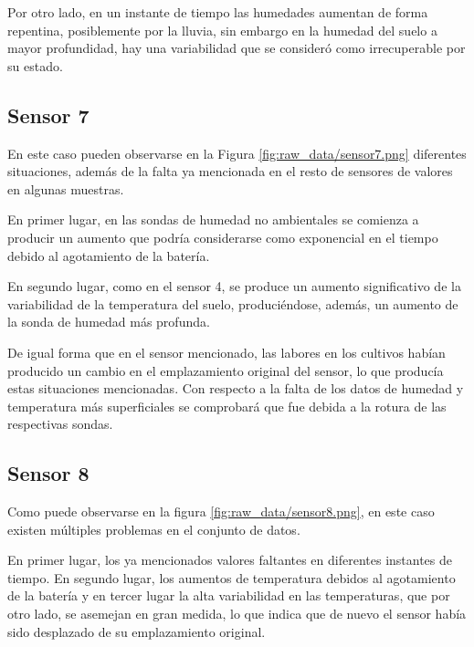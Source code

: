 Por otro lado, en un instante de tiempo las humedades aumentan de forma repentina, posiblemente
por la lluvia, sin embargo en la humedad del suelo a mayor profundidad, hay una variabilidad
que se consideró como irrecuperable por su estado.

\newpage
\subsection{Sensor 7}


En este caso pueden observarse en la Figura \ref{fig:raw_data/sensor7.png} diferentes
situaciones, además de la falta ya mencionada en el resto de sensores de valores
en algunas muestras.

En primer lugar, en las sondas de humedad no ambientales se comienza a producir un aumento
que podría considerarse como exponencial en el tiempo debido al agotamiento de la batería.

En segundo lugar, como en el sensor 4, se produce un aumento significativo de la variabilidad
de la temperatura del suelo, produciéndose, además, un aumento de la sonda de
humedad más profunda.

De igual forma que en el sensor mencionado, las labores en los cultivos habían producido un
cambio en el emplazamiento original del sensor, lo que producía estas situaciones mencionadas.
Con respecto a la falta de los datos de humedad y temperatura más superficiales se 
comprobará que fue debida a la rotura de las respectivas sondas.

\newpage
\subsection{Sensor 8}


Como puede observarse en la figura \ref{fig:raw_data/sensor8.png}, en este caso existen 
múltiples problemas en el conjunto de datos.

En primer lugar, los ya mencionados valores faltantes en diferentes instantes de tiempo.
En segundo lugar, los aumentos de temperatura debidos al agotamiento de la batería y en tercer
lugar la alta variabilidad en las temperaturas, que por otro lado, se asemejan en gran medida,
lo que indica que de nuevo el sensor había sido desplazado de su emplazamiento original.

